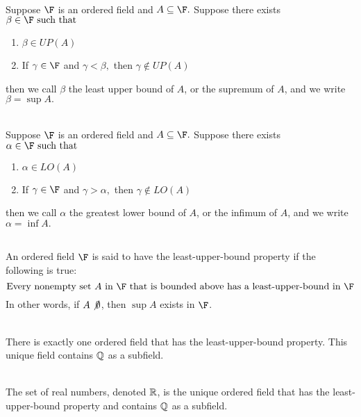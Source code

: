 \begin{definition}[Supremum] \leavevmode \\
    Suppose $\F$ is an ordered field and $A\subseteq \F.$ Suppose there exists $\beta \in \F \st$
    \begin{enumerate}[$(i)$]
        \item $\beta \in UP(A)$
        \item If $\gamma \in \F$ and $\gamma < \beta,$ then $\gamma \not \in UP(A)$
    \end{enumerate}
    then we call $\beta$ the least upper bound of $A$, or the supremum of $A$, and we write $\beta = \sup A.$
\end{definition}

\begin{definition}[Infimum] \leavevmode \\
    Suppose $\F$ is an ordered field and $A\subseteq \F.$ Suppose there exists $\alpha \in \F \st$
    \begin{enumerate}[$(i)$]
        \item $\alpha \in LO(A)$
        \item If $\gamma \in \F$ and $\gamma > \alpha,$ then $\gamma \not \in LO(A)$
    \end{enumerate}
    then we call $\alpha$ the greatest lower bound of $A$, or the infimum of $A$, and we write $\alpha = \inf A.$
\end{definition}

\begin{definition} \leavevmode \\
    An ordered field $\F$ is said to have the least-upper-bound property if the following is true:
    $$\text{Every nonempty set $A$ in $\F$ that is bounded above has a least-upper-bound in $\F$}$$
    In other words, if $A \not \emptyset$, then $\sup A$ exists in $\F$.
\end{definition}

\begin{theorem} \leavevmode \\
    There is exactly one ordered field that has the least-upper-bound property. This unique field contains $\mathbb{Q}$ as a subfield.
\end{theorem}

\begin{definition} \leavevmode \\
    The set of real numbers, denoted $\mathbb{R}$, is the unique ordered field that has the least-upper-bound property and contains $\mathbb{Q}$ as a subfield.
\end{definition}

